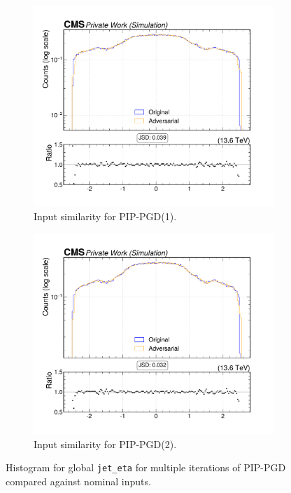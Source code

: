 \begin{figure}[htbp]
  \centering
  \begin{subfigure}[t]{0.5\textwidth}
    \includegraphics[width=\linewidth]{media/output/features/compare/combined_it_1/cmp_global_features_jet_eta.pdf}
    \caption{Input similarity for PIP-PGD(1).}
    \label{fig:left}
  \end{subfigure}\hfill
  \begin{subfigure}[t]{0.5\textwidth}
    \includegraphics[width=\linewidth]{media/output/features/compare/combined_it_2/cmp_global_features_jet_eta.pdf}
    \caption{Input similarity for PIP-PGD(2).}
    \label{fig:middle}
  \end{subfigure}\hfill

  \caption{Histogram for global \texttt{jet\_eta} for multiple iterations of PIP-PGD compared against nominal inputs.}
  \label{fig:combined_input_eta}
\end{figure}

